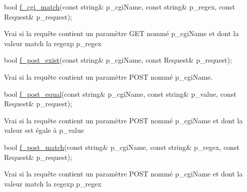 \begin{DoxyItemize}
\item 
\begin{DoxyCode}
\textcolor{keywordtype}{bool} \hyperlink{classxtd_1_1network_1_1http_1_1Server_a0218f1e1bed9e1ae09b6a772a38645ef}{f\_cgi\_match}(\textcolor{keyword}{const} \textcolor{keywordtype}{string}& p\_cgiName, \textcolor{keyword}{const} \textcolor{keywordtype}{string}& p\_regex, \textcolor{keyword}{const} Request& p\_request); 
\end{DoxyCode}
 \par
\par
 Vrai si la requête contient un paramètre G\-E\-T nommé p\-\_\-cgi\-Name et dont la valeur match la regexp p\-\_\-regex \par
\par

\item 
\begin{DoxyCode}
\textcolor{keywordtype}{bool} \hyperlink{classxtd_1_1network_1_1http_1_1Server_aa6ea204c5132836f0c4112aaa331b3a1}{f\_post\_exist}(\textcolor{keyword}{const} \textcolor{keywordtype}{string}& p\_cgiName, \textcolor{keyword}{const} Request& p\_request); 
\end{DoxyCode}
 Vrai si la requête contient un paramètre P\-O\-S\-T nommé p\-\_\-cgi\-Name. \par
\par
 \par
\par

\item 
\begin{DoxyCode}
\textcolor{keywordtype}{bool} \hyperlink{classxtd_1_1network_1_1http_1_1Server_aa9b902188ce45e96f65fc53a20ff06ce}{f\_post\_equal}(\textcolor{keyword}{const} \textcolor{keywordtype}{string}& p\_cgiName, \textcolor{keyword}{const} \textcolor{keywordtype}{string}& p\_value, \textcolor{keyword}{const} Request& p\_request); 
\end{DoxyCode}
 \par
\par
 Vrai si la requête contient un paramètre P\-O\-S\-T nommé p\-\_\-cgi\-Name et dont la valeur est égale à p\-\_\-value \par
\par

\item 
\begin{DoxyCode}
\textcolor{keywordtype}{bool} \hyperlink{classxtd_1_1network_1_1http_1_1Server_ad343ecdd51be8e982a37cd6fa4ee55ac}{f\_post\_match}(\textcolor{keyword}{const} \textcolor{keywordtype}{string}& p\_cgiName, \textcolor{keyword}{const} \textcolor{keywordtype}{string}& p\_regex, \textcolor{keyword}{const} Request& p\_request); 
\end{DoxyCode}
 \par
\par
 Vrai si la requête contient un paramètre P\-O\-S\-T nommé p\-\_\-cgi\-Name et dont la valeur match la regexp p\-\_\-regex \par
\par


\end{DoxyItemize}
